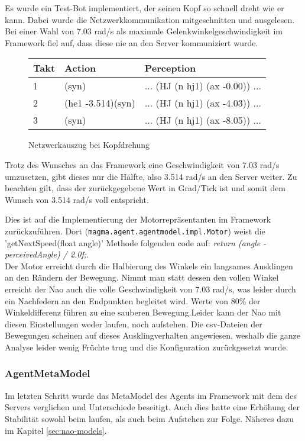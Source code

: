Es wurde ein Test-Bot implementiert, der seinen Kopf so schnell dreht wie er kann. Dabei wurde die Netzwerkkommunikation mitgeschnitten und ausgelesen.
Bei einer Wahl von 7.03 rad/s als maximale Gelenkwinkelgeschwindigkeit im Framework fiel auf, dass diese nie an den Server kommuniziert wurde.

\begin{figure}[H]
	\centering
	\begin{tabularx}{\textwidth}{|X|X|X|}
		\hline
		Takt & Action & Perception\\
		\hline
		1 & (syn) & ... (HJ (n hj1) (ax -0.00)) ...\\
		\hline
        2 & (he1 -3.514)(syn) & ... (HJ (n hj1) (ax -4.03)) ...\\
        \hline
        3 & (syn) & ... (HJ (n hj1) (ax -8.05)) ...\\
		\hline
	\end{tabularx}
	\caption{Netzwerkauszug bei Kopfdrehung}
	\label{fig:networkjointanalysis}
\end{figure}

Trotz des Wunsches an das Framework eine Geschwindigkeit von 7.03 rad/s umzusetzen, gibt dieses nur die Hälfte, also 3.514 rad/s an den Server weiter.
Zu beachten gilt, dass der zurückgegebene Wert in Grad/Tick ist und somit dem Wunsch von 3.514 rad/s voll entspricht.

Dies ist auf die Implementierung der Motorrepräsentanten im Framework zurückzuführen.
Dort (\texttt{magma.agent.agentmodel.impl.Motor}) weist die 'getNextSpeed(float angle)' Methode folgenden code auf: \textit{return (angle - perceivedAngle) / 2.0f;}.\\
Der Motor erreicht durch die Halbierung des Winkels ein langsames Ausklingen an den Rändern der Bewegung. Nimmt man statt dessen den vollen Winkel erreicht der Nao auch die volle Geschwindigkeit von 7.03 rad/s, was leider durch ein Nachfedern an den Endpunkten begleitet wird. Werte von 80\% der Winkeldifferenz führen zu eine sauberen Bewegung.Leider kann der Nao mit diesen Einstellungen weder laufen, noch aufstehen. Die csv-Dateien der Bewegungen scheinen auf dieses Ausklingverhalten angewiesen, weshalb die ganze Analyse leider wenig Früchte trug und die Konfiguration zurückgesetzt wurde.

\subsubsection{AgentMetaModel}
Im letzten Schritt wurde das MetaModel des Agents im Framework mit dem des Servers verglichen und Unterschiede beseitigt. Auch dies hatte eine Erhöhung der Stabilität sowohl beim laufen, als auch beim Aufstehen zur Folge. Näheres dazu im Kapitel \ref{sec:nao-models}.